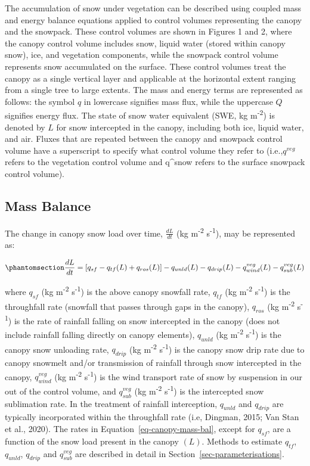 \documentclass[
  letterpaper,
]{tex/uofsthesis-cs}
\begin{document}
The accumulation of snow under vegetation can be described using coupled
mass and energy balance equations applied to control volumes
representing the canopy and the snowpack. These control volumes are
shown in Figures 1 and 2, where the canopy control volume includes snow,
liquid water (stored within canopy snow), ice, and vegetation
components, while the snowpack control volume represents snow
accumulated on the surface. These control volumes treat the canopy as a
single vertical layer and applicable at the horizontal extent ranging
from a single tree to large extents. The mass and energy terms are
represented as follows: the symbol \(q\) in lowercase signifies mass
flux, while the uppercase \(Q\) signifies energy flux. The state of snow
water equivalent (SWE, kg m\textsuperscript{-2}) is denoted by \(L\) for
snow intercepted in the canopy, including both ice, liquid water, and
air. Fluxes that are repeated between the canopy and snowpack control
volume have a superscript to specify what control volume they refer to
(i.e.,\(q^{veg}\) refers to the vegetation control volume and q\^{}snow
refers to the surface snowpack control volume).

\subsection{Mass Balance}\label{sec-mass-bal}

The change in canopy snow load over time, \(\frac{dL}{dt}\) (kg
m\textsuperscript{-2} s\textsuperscript{-1}), may be represented as:

\begin{equation}\phantomsection\label{eq-canopy-mass-bal}{
\frac{dL}{dt} = 
[q_{sf} - q_{tf}(L) + q_{ros}(L)] - q_{unld}(L) - q_{drip}(L) - q_{wind}^{veg}(L) - q_{sub}^{veg}(L)
}\end{equation}

where \(q_{sf}\) (kg m\textsuperscript{-2} s\textsuperscript{-1}) is the
above canopy snowfall rate, \(q_{tf}\) (kg m\textsuperscript{-2}
s\textsuperscript{-1}) is the throughfall rate (snowfall that passes
through gaps in the canopy), \(q_{ros}\) (kg m\textsuperscript{-2}
s\textsuperscript{-1}) is the rate of rainfall falling on snow
intercepted in the canopy (does not include rainfall falling directly on
canopy elements), \(q_{unld}\) (kg m\textsuperscript{-2}
s\textsuperscript{-1}) is the canopy snow unloading rate, \(q_{drip}\)
(kg m\textsuperscript{-2} s\textsuperscript{-1}) is the canopy snow drip
rate due to canopy snowmelt and/or transmission of rainfall through snow
intercepted in the canopy, \(q_{wind}^{veg}\) (kg m\textsuperscript{-2}
s\textsuperscript{-1}) is the wind transport rate of snow by suspension
in our out of the control volume, and \(q_{sub}^{veg}\) (kg
m\textsuperscript{-2} s\textsuperscript{-1}) is the intercepted snow
sublimation rate. In the treatment of rainfall interception,
\(q_{unld}\) and \(q_{drip}\) are typically incorporated within the
throughfall rate (i.e, Dingman, 2015; Van Stan et al., 2020). The rates
in Equation~\ref{eq-canopy-mass-bal}, except for \(q_{sf}\), are a
function of the snow load present in the canopy \((L)\). Methods to
estimate \(q_{tf}\), \(q_{unld}\), \(q_{drip}\) and \(q_{sub}^{veg}\)
are described in detail in Section~\ref{sec-parameterisations}.
\end{document}
